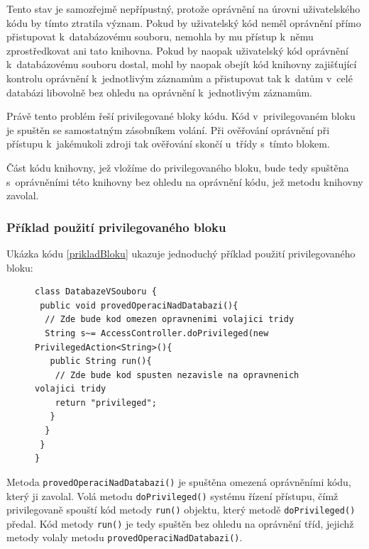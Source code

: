 Tento stav je samozřejmě nepřípustný, protože oprávnění na úrovni uživatelského kódu by tímto ztratila význam. Pokud by uživatelský kód neměl oprávnění přímo přistupovat k~databázovému souboru, nemohla by mu přístup k~němu zprostředkovat ani tato knihovna. Pokud by naopak uživatelský kód oprávnění k~databázovému souboru dostal, mohl by naopak obejít kód knihovny zajišťující kontrolu oprávnění k~jednotlivým záznamům a přistupovat tak k~datům v~celé databázi libovolně bez ohledu na oprávnění k~jednotlivým záznamům.

Právě tento problém řeší privilegované bloky kódu. Kód v~privilegovaném bloku je spuštěn se samostatným zásobníkem volání. Při ověřování oprávnění při přístupu k~jakémukoli zdroji tak ověřování skončí u~třídy s~tímto blokem. \cite{refAccessController}

Část kódu knihovny, jež vložíme do privilegovaného bloku, bude tedy spuštěna s~oprávněními této knihovny bez ohledu na oprávnění kódu, jež metodu knihovny zavolal.

\subsubsection{Příklad použití privilegovaného bloku}

Ukázka kódu \ref{prikladBloku} ukazuje jednoduchý příklad použití privilegovaného bloku: \cite{refAccessController}

\begin{figure}[tbh]
\begin{lstlisting}[caption=Příklad použití privilegovaného bloku, label=prikladBloku]
class DatabazeVSouboru {
 public void provedOperaciNadDatabazi(){
  // Zde bude kod omezen opravnenimi volajici tridy
  String s~= AccessController.doPrivileged(new PrivilegedAction<String>(){
   public String run(){
    // Zde bude kod spusten nezavisle na opravnenich volajici tridy
    return "privileged";
   }
  }
 }
}
\end{lstlisting}
\end{figure}

Metoda {\tt provedOperaciNadDatabazi()} je spuštěna omezená oprávněními kódu, který ji zavolal.
Volá metodu {\tt doPrivileged()} systému řízení přístupu, čímž privilegovaně spouští kód metody {\tt run()} objektu, který metodě {\tt doPrivileged()} předal.
Kód metody {\tt run()} je tedy spuštěn bez ohledu na oprávnění tříd, jejichž metody volaly metodu {\tt provedOperaciNadDatabazi()}.

